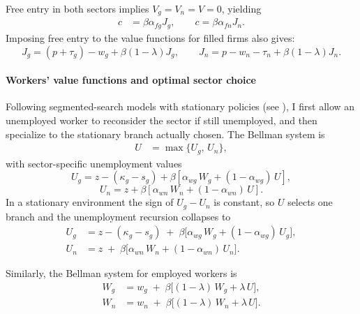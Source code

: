 \documentclass[preprint,12pt]{elsarticle}
\begin{document}

\noindent Free entry in both sectors implies $V_g=V_n=V=0$, yielding
\begin{align}
c &=\beta\alpha_{fg}J_g,\qquad c=\beta\alpha_{fn}J_n.
\label{eq free entry}
\end{align}
Imposing free entry to the value functions for filled firms also gives: 
\begin{equation}
J_g=(p+\tau_g)-w_g+\beta(1-\lambda)J_g,\qquad
J_n=p-w_n-\tau_n+\beta(1-\lambda)J_n.
\label{j}
\end{equation}

\paragraph{Workers’ value functions and optimal sector choice}
Following segmented-search models with stationary policies (see \citet{GeromichalosKospentaris2022Merit}), I first allow an unemployed worker to reconsider the sector if still unemployed, and then specialize to the stationary branch actually chosen. The Bellman system is
\begin{align}
U &= \max\{U_g,\,U_n\}, \label{eq:U_def}
\end{align}
with sector-specific unemployment values
\[
U_g = z - (\kappa_g - s_g) + \beta\!\left[\alpha_{wg}\, W_g + (1-\alpha_{wg})\, U\right],\]
\[
U_n = z + \beta\!\left[\alpha_{wn}\, W_n + (1-\alpha_{wn})\, U\right].
\]
In a stationary environment the sign of $U_g-U_n$ is constant, so \(U\) selects one branch and the unemployment recursion collapses to
\begin{align}
U_g &= z - (\kappa_g-s_g) \;+\; \beta\big[\alpha_{wg}\, W_g + (1-\alpha_{wg})\, U_g\big], \label{eq:unemployed_value_g} \\[4pt]
U_n &= z \;+\; \beta\big[\alpha_{wn}\, W_n + (1-\alpha_{wn})\, U_n\big]. \label{eq:unemployed_value_n}
\end{align}

Similarly, the Bellman system for employed workers is
\begin{align}
W_g &= w_g \;+\; \beta\big[(1-\lambda)\, W_g + \lambda\, U\big], \label{eq:employed_value_g} \\[4pt]
W_n &= w_n \;+\; \beta\big[(1-\lambda)\, W_n + \lambda\, U\big]. \label{eq:employed_value_n}
\end{align}
\end{document}
